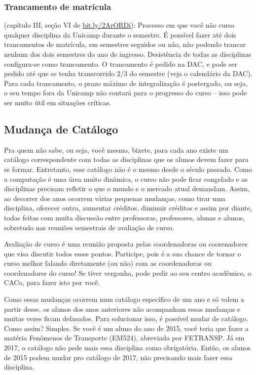 \subsubsection{Trancamento de matrícula} (capítulo III, seção VI de
\url{bit.ly/2ArORDi}): Processo em que você não cursa qualquer disciplina da
Unicamp durante o semestre. É possível fazer até dois trancamentos de
matrícula, em semestres seguidos ou não, não podendo trancar nenhum dos dois
semestres do ano de ingresso. Desistência de todas as disciplinas configura-se
como trancamento. O trancamento é pedido na DAC, e pode ser pedido até que se
tenha transcorrido 2/3 do semestre (veja o calendário da DAC). Para cada
trancamento, o prazo máximo de integralização é postergado, ou seja, o seu
tempo fora da Unicamp não contará para o progresso do curso -- isso pode ser
muito útil em situações críticas.

\subsection{Mudança de Catálogo}

Pra quem não sabe, ou seja, você mesmo, bixete, para cada ano existe um
catálogo correspondente com todas as disciplinas que os alunos devem fazer para
se formar. Entretanto, esse catálogo não é o mesmo desde o século passado. Como
a computação é uma área muito dinâmica, o curso não pode ficar congelado e as
disciplinas precisam refletir o que o mundo e o mercado atual demandam. Assim,
ao decorrer dos anos ocorrem várias pequenas mudanças, como tirar uma
disciplina, oferecer outra, aumentar créditos, diminuir créditos e assim por
diante, todas feitas com muita discussão entre professoras, professores, alunas
e alunos, sobretudo nas reuniões semestrais de avaliação de curso.

Avaliação de curso é uma reunião proposta pelas coordenadoras ou coorenadores
que visa discutir todos esses pontos. Participe, pois é a sua chance de tornar
o curso melhor falando diretamente (ou não) com as coordenadoras ou
coordenadores do curso! Se tiver vergonha, pode pedir ao seu centro acadêmico,
o CACo, para fazer isto por você.

Como essas mudanças ocorrem num catálogo específico de um ano e só valem a
partir desse, os alunos dos anos anteriores não acompanham essas mudanças e
muitas vezes ficam defasados. Para solucionar isso, é possível mudar de
catálogo. Como assim? Simples. Se você é um aluno do ano de 2015, você teria
que fazer a matéria Fenômenos de Transporte (EM524), abreviada por FETRANSP. Já
em 2017, o catálogo não pede mais essa disciplina como obrigatória. Então, os
alunos de 2015 podem mudar pro catálogo de 2017, não precisando mais fazer essa
disciplina.

